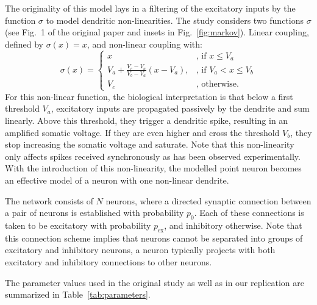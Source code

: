 \documentclass[10pt,a4paper,onecolumn]{article}
\begin{document}
The originality of this model lays in a filtering of the excitatory inputs by the function $\sigma$ to model dendritic non-linearities. The study considers two functions $\sigma$ (see Fig.~1 of the original paper and insets in Fig.~\ref{fig:markov}). Linear coupling, defined by $\sigma(x)=x$, and non-linear coupling with:
\begin{equation}
    \sigma(x)= 
\begin{cases}
    x              & \text{, if } x\leq V_a\\
    V_a + \frac{V_c-V_a}{V_b-V_a} (x - V_a), & \text{, if } V_a<x \leq V_b\\
    V_c            & \text{, otherwise.}
\end{cases}
\end{equation}
For this non-linear function, the biological interpretation is that below a first threshold $V_a$, excitatory inputs are propagated passively by the dendrite and sum linearly. Above this threshold, they trigger a dendritic spike, resulting in an amplified somatic voltage. If they are even higher and cross the threshold $V_b$, they stop increasing the somatic voltage and saturate. Note that this non-linearity only affects spikes received synchronously as has been observed experimentally. With the introduction of this non-linearity, the modelled point neuron becomes an effective model of a neuron with one non-linear dendrite.

The network consists of $N$ neurons, where a directed synaptic connection between a pair of neurons is established with probability $p_0$. Each of these connections is taken to be excitatory with probability $p_\text{ex}$, and inhibitory otherwise. Note that this connection scheme implies that neurons cannot be separated into groups of excitatory and inhibitory neurons, a neuron typically projects with both excitatory and inhibitory connections to other neurons.

The parameter values used in the original study as well as in our replication are summarized in Table~\ref{tab:parameters}.
\end{document}
